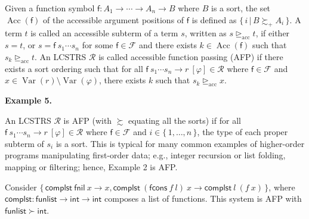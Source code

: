 \documentclass[10pt,a4paper]{amsart}
\begin{document}
 
 
Given a function symbol $\mathsf{f}:{A}_{1}\rightarrow\cdots\rightarrow{A}_{n}\rightarrow B$ where $B$ is a sort, the set $\operatorname{Acc}(\mathsf{f})$ of the accessible argument positions of $\mathsf{f}$ is defined as $\{\,i\,|\,B\succsim_{+}A_{i}\,\}$. A term $t$ is called an accessible subterm of a term $s$, written as $s\trianglerighteq_{\mathrm{acc}}t$, if either $s=t$, or $s={\mathsf{f}}\ {{s}_{1}\cdots{s}_{n}}$ for some $\mathsf{f}\in\mathcal{F}$ and there exists $k\in\operatorname{Acc}(\mathsf{f})$ such that $s_{k}\trianglerighteq_{\mathrm{acc}}t$. An LCSTRS $\mathcal{R}$ is called accessible function passing (AFP) if there exists a sort ordering such that for all ${{\mathsf{f}}\ {{s}_{1}\cdots{s}_{n}}}\rightarrow{r}\ [\varphi]\in\mathcal{R}$ where $\mathsf{f}\in\mathcal{F}$ and $x\in\operatorname{Var}(r)\setminus\operatorname{Var}(\varphi)$, there exists $k$ such that $s_{k}\trianglerighteq_{\mathrm{acc}}x$.\par
 
 
 
\par\medskip\noindent\textbf{Example 5.}\par
 
 
An LCSTRS $\mathcal{R}$ is AFP (with $\succsim$ equating all the sorts) if for all ${{\mathsf{f}}\ {{s}_{1}\cdots{s}_{n}}}\rightarrow{r}\ [\varphi]\in\mathcal{R}$ where $\mathsf{f}\in\mathcal{F}$ and $i\in\{\,1,\ldots,n\,\}$, the type of each proper subterm of $s_{i}$ is a sort. This is typical for many common examples of higher-order programs manipulating first-order data; e.g., integer recursion or list folding, mapping or filtering; hence, Example 2 is AFP.\par
 
 
 
Consider $\{\,{{\mathsf{complst}}\ {\mathsf{fnil}}}\ {x}\rightarrow x,{{\mathsf{complst}}\ {({{\mathsf{fcons}}\ {f}}\ {l})}}\ {x}\rightarrow{{\mathsf{complst}}\ {l}}\ {({f}\ {x})}\,\}$, where $\mathsf{complst}:\mathsf{funlist}\rightarrow\mathsf{int}\rightarrow\mathsf{int}$ composes a list of functions. This system is AFP with $\mathsf{funlist}\succ\mathsf{int}$.\par
 
\end{document}
